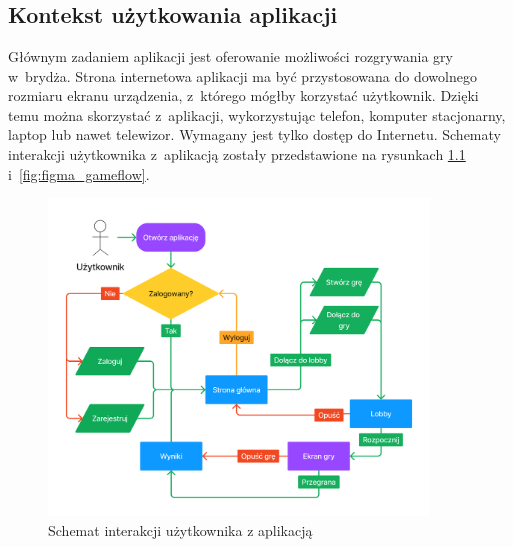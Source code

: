 \chapter{\ChapterTitleScope}
\label{sec:zakres-funkcjonalnosci}


\section{Kontekst użytkowania aplikacji}

Głównym zadaniem aplikacji jest oferowanie możliwości
rozgrywania gry w~brydża. Strona internetowa aplikacji ma być
przystosowana do dowolnego rozmiaru ekranu urządzenia, z~którego mógłby
korzystać użytkownik. Dzięki temu można skorzystać z~aplikacji, wykorzystując
telefon, komputer stacjonarny, laptop lub nawet telewizor. Wymagany
jest tylko dostęp do Internetu.
Schematy interakcji użytkownika z~aplikacją zostały przedstawione na rysunkach
\ref{fig:figma_userflow} i~\ref{fig:figma_gameflow}. \\

\begin{figure}[h!]
    \centering
    \includegraphics[width=0.9\textwidth]{img/flow-aplikacji/user_flow.png}
    \caption{Schemat interakcji użytkownika z aplikacją}
    \label{fig:figma_userflow}
\end{figure}

